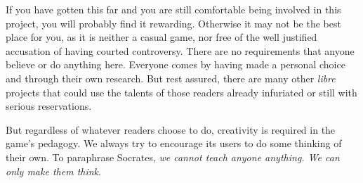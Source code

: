 If you have gotten this far and you are still comfortable being involved in this project, you will probably find it rewarding. Otherwise it may not be the best place for you, as it is neither a casual game, nor free of the well justified accusation of having courted controversy. There are no requirements that anyone believe or do anything here. Everyone comes by having made a personal choice and through their own research. But rest assured, there are many other {\it libre} projects that could use the talents of those readers already infuriated or still with serious reservations.

But regardless of whatever readers choose to do, creativity is required in the game's pedagogy. We always try to encourage its users to do some thinking of their own. To paraphrase Socrates, {\it we cannot teach anyone anything. We can only make them think}.

\StopChapter
